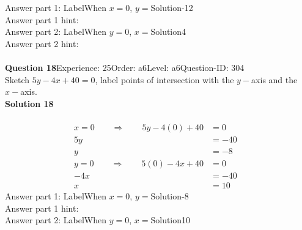 \documentclass{article}
\begin{document}
Answer part 1: \hspace{10pt}Label\hspace{10pt}When $x=0$, $y=$\hspace{10pt}Solution\hspace{10pt}-12\\
Answer part 1 hint: \hspace{15pt}\\
Answer part 2: \hspace{10pt}Label\hspace{10pt}When $y=0$, $x=$\hspace{10pt}Solution\hspace{10pt}4\\
Answer part 2 hint: \hspace{15pt}\\
\\[4pt]
\noindent\textbf{Question 18}\hspace{20pt}Experience: 25\hspace{20pt}Order: a6\hspace{20pt}Level: a6\hspace{20pt}Question-ID: 304\\[2pt]
Sketch $5y-4x+40=0$, label points of intersection with the $y-$axis and the $x-$axis.\\[4pt]
\noindent\textbf{Solution 18}\\[2pt]
\\[-35pt]\begin{align*}
x=0\qquad\Rightarrow\qquad 5y-4(0)+40&=0&\\[2pt]
5y&=-40\\[2pt]
y&=-8\\[12pt]
y=0\qquad\Rightarrow\qquad 5(0)-4x+40&=0&\\[2pt]
-4x&=-40\\[2pt]
x&=10
\end{align*}
Answer part 1: \hspace{10pt}Label\hspace{10pt}When $x=0$, $y=$\hspace{10pt}Solution\hspace{10pt}-8\\
Answer part 1 hint: \hspace{15pt}\\
Answer part 2: \hspace{10pt}Label\hspace{10pt}When $y=0$, $x=$\hspace{10pt}Solution\hspace{10pt}10\\
\end{document}
